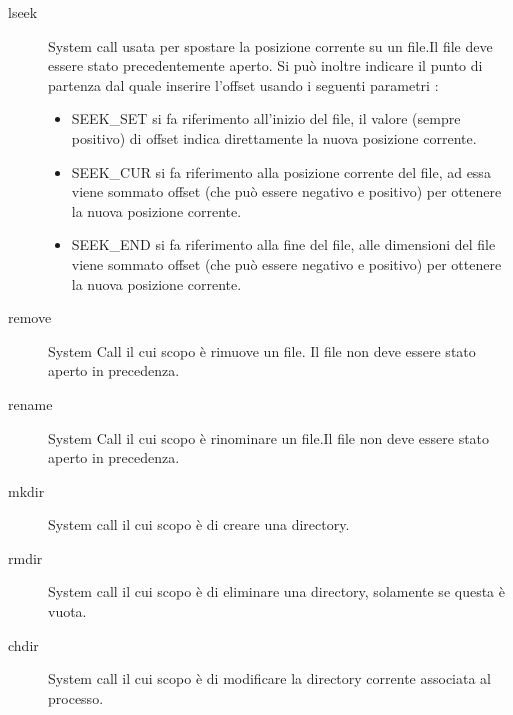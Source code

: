      \begin{description}
      \item[lseek] System call usata per spostare la posizione corrente su un file.Il file deve essere stato precedentemente aperto. 
      Si può inoltre indicare il punto di partenza dal quale inserire l'offset usando i seguenti parametri : \\
	\begin{itemize}
	 \item SEEK\_SET si fa riferimento all'inizio del file,  
	      il valore (sempre positivo) di offset indica direttamente la nuova posizione corrente.        
	 \item SEEK\_CUR si fa riferimento alla posizione corrente del file,  ad essa viene sommato offset (che può essere negativo 
	      e positivo) per ottenere la nuova posizione corrente. 
	\item  SEEK\_END si fa riferimento alla fine del file, alle dimensioni  del file viene sommato offset (che può essere negativo  e positivo) per ottenere la nuova posizione corrente.  
	\end{itemize}

      \end{description}
    
    \begin{description}
     \item[remove] System Call il cui scopo è rimuove un file. Il file non deve essere stato aperto in precedenza. 
     \end{description}
     
     \begin{description}
      \item[rename] System Call il cui scopo è rinominare un file.Il file non deve essere stato aperto in precedenza. 
      \end{description}

    \begin{description}
     \item[mkdir]System call il cui scopo è di creare una directory.
     \end{description}
     
     \begin{description}
      \item[rmdir] System call il cui scopo è di eliminare una directory, solamente se questa è vuota. 
      \end{description}
      
      \begin{description}
       \item[chdir] System call il cui scopo è di modificare la directory corrente associata al processo. 
       \end{description}

